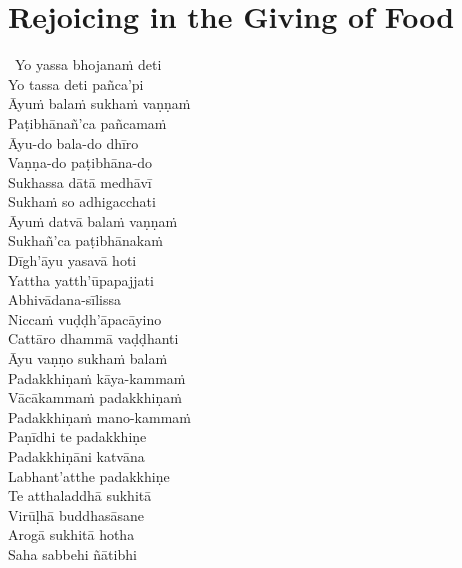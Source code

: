 \section{Rejoicing in the Giving of Food}
\label{rejoing-in-giving-food}

\ifninebythirteenversion\vspace{0.25em}\fi

\begin{verses}
  \anglebracketleft\ \hspace{-0.5mm}Yo yassa bhojanaṁ deti \hspace{-0.5mm}\anglebracketright\ \\
  Yo tassa deti pañca'pi\\
  Āyuṁ balaṁ sukhaṁ vaṇṇaṁ\\
  Paṭibhānañ'ca pañcamaṁ\makeatletter\hyperlink{endnote122-appendix}\makeatother\\
  Āyu-do bala-do dhīro\\
  Vaṇṇa-do paṭibhāna-do\\
  Sukhassa dātā medhāvī\\
  Sukhaṁ so adhigacchati\\
  Āyuṁ datvā balaṁ vaṇṇaṁ\\
  Sukhañ'ca paṭibhānakaṁ\ifdigitalversion\makeatletter\hyperlink{endnote123-appendix}\makeatother\fi\\
  Dīgh'āyu yasavā hoti\\
  Yattha yatth'ūpapajjati\\
  Abhivādana-sīlissa\\
  Niccaṁ vuḍḍh'āpacāyino\\
  Cattāro dhammā vaḍḍhanti\\
  Āyu vaṇṇo sukhaṁ balaṁ\\
  Padakkhiṇaṁ kāya-kammaṁ\\
  Vācākammaṁ padakkhiṇaṁ\\
  Padakkhiṇaṁ mano-kammaṁ\\
  Paṇīdhi te padakkhiṇe\\
  Padakkhiṇāni katvāna\\
  Labhant'atthe padakkhiṇe\\
  Te atthaladdhā sukhitā\\
  Virūḷhā buddhasāsane\\
  Arogā sukhitā hotha\\
  Saha sabbehi ñātibhi
\end{verses}

